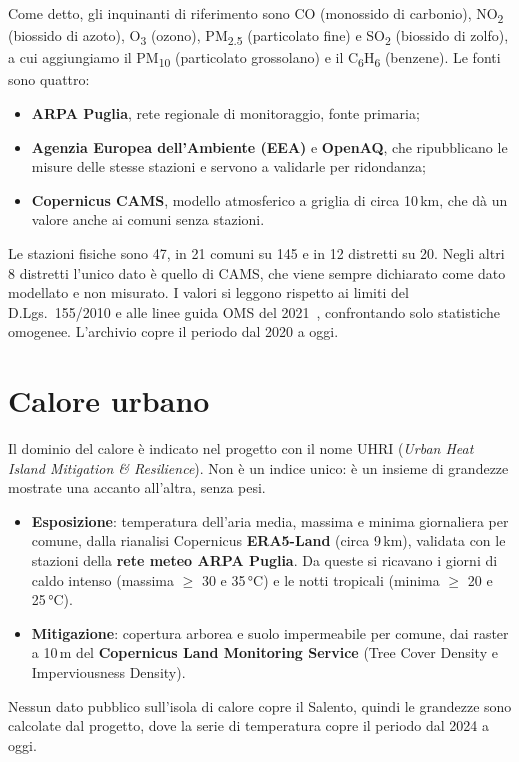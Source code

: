 Come detto, gli inquinanti di riferimento sono CO (monossido di carbonio), NO\textsubscript{2} (biossido di azoto), O\textsubscript{3} (ozono), PM\textsubscript{2.5} (particolato fine) e SO\textsubscript{2} (biossido di zolfo), a cui aggiungiamo il PM\textsubscript{10} (particolato grossolano) e il C\textsubscript{6}H\textsubscript{6} (benzene). Le fonti sono quattro:
\begin{itemize}
  \item \textbf{ARPA Puglia}, rete regionale di monitoraggio, fonte primaria;
  \item \textbf{Agenzia Europea dell'Ambiente (EEA)} e \textbf{OpenAQ}, che ripubblicano le misure delle stesse stazioni e servono a validarle per ridondanza;
  \item \textbf{Copernicus CAMS}, modello atmosferico a griglia di circa 10\,km, che dà un valore anche ai comuni senza stazioni.
\end{itemize}
Le stazioni fisiche sono 47, in 21 comuni su 145 e in 12 distretti su 20. Negli altri 8 distretti l'unico dato è quello di CAMS, che viene sempre dichiarato come dato modellato e non misurato. I valori si leggono rispetto ai limiti del D.Lgs.~155/2010 e alle linee guida OMS del 2021~\cite{dlgs_155_2010,who_aqg_2021}, confrontando solo statistiche omogenee. L'archivio copre il periodo dal 2020 a oggi.

\section{Calore urbano}
\label{sec:domini-calore}

Il dominio del calore è indicato nel progetto con il nome UHRI (\emph{Urban Heat Island Mitigation \& Resilience}). Non è un indice unico: è un insieme di grandezze mostrate una accanto all'altra, senza pesi.
\begin{itemize}
  \item \textbf{Esposizione}: temperatura dell'aria media, massima e minima giornaliera per comune, dalla rianalisi Copernicus \textbf{ERA5-Land} (circa 9\,km), validata con le stazioni della \textbf{rete meteo ARPA Puglia}. Da queste si ricavano i giorni di caldo intenso (massima $\geq$ 30 e 35\,°C) e le notti tropicali (minima $\geq$ 20 e 25\,°C).
  \item \textbf{Mitigazione}: copertura arborea e suolo impermeabile per comune, dai raster a 10\,m del \textbf{Copernicus Land Monitoring Service} (Tree Cover Density e Imperviousness Density).
\end{itemize}
Nessun dato pubblico sull'isola di calore copre il Salento, quindi le grandezze sono calcolate dal progetto, dove la serie di temperatura copre il periodo dal 2024 a oggi.

